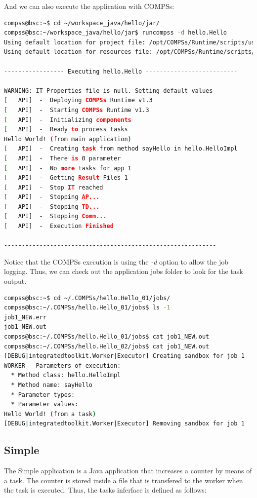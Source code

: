 And we can also execute the application with COMPSs:

\begin{lstlisting}[language=bash]
compss@bsc:~$ cd ~/workspace_java/hello/jar/
compss@bsc:~/workspace_java/hello/jar$ runcompss -d hello.Hello
Using default location for project file: /opt/COMPSs/Runtime/scripts/user/../../configuration/xml/projects/project.xml
Using default location for resources file: /opt/COMPSs/Runtime/scripts/user/../../configuration/xml/resources/resources.xml

----------------- Executing hello.Hello --------------------------

WARNING: IT Properties file is null. Setting default values
[   API]  -  Deploying COMPSs Runtime v1.3
[   API]  -  Starting COMPSs Runtime v1.3
[   API]  -  Initializing components
[   API]  -  Ready to process tasks
Hello World! (from main application)
[   API]  -  Creating task from method sayHello in hello.HelloImpl
[   API]  -  There is 0 parameter
[   API]  -  No more tasks for app 1
[   API]  -  Getting Result Files 1
[   API]  -  Stop IT reached
[   API]  -  Stopping AP...
[   API]  -  Stopping TD...
[   API]  -  Stopping Comm...
[   API]  -  Execution Finished

------------------------------------------------------------
\end{lstlisting}

Notice that the COMPSs execution is using the \textit{-d} option to allow the job logging. Thus, we can check out the application jobs folder to look for
the task output.

\begin{lstlisting}[language=bash]
compss@bsc:~$ cd ~/.COMPSs/hello.Hello_01/jobs/
compss@bsc:~/.COMPSs/hello.Hello_01/jobs$ ls -1
job1_NEW.err
job1_NEW.out
compss@bsc:~/.COMPSs/hello.Hello_01/jobs$ cat job1_NEW.out
compss@bsc:~/.COMPSs/hello.Hello_02/jobs$ cat job1_NEW.out 
[DEBUG|integratedtoolkit.Worker|Executor] Creating sandbox for job 1
WORKER - Parameters of execution:
  * Method class: hello.HelloImpl
  * Method name: sayHello
  * Parameter types:
  * Parameter values:
Hello World! (from a task)
[DEBUG|integratedtoolkit.Worker|Executor] Removing sandbox for job 1
\end{lstlisting}

\subsection{Simple}
The Simple application is a Java application that increases a counter by means of a task. The counter is stored inside a file that 
is transfered to the worker when the task is executed. Thus, the tasks inferface is defined as follows:

